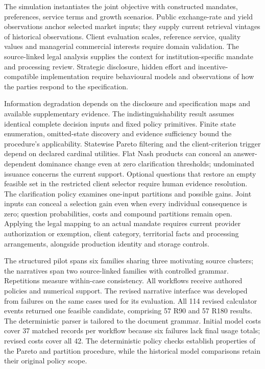 \documentclass[oneside,10pt,english]{swissi}
\begin{document}
The simulation instantiates the joint objective with constructed mandates, preferences, service terms and growth scenarios. Public exchange-rate and yield observations anchor selected market inputs; they supply current retrieval vintages of historical observations. Client evaluation scales, reference service, quality values and managerial commercial interests require domain validation. The source-linked legal analysis supplies the context for institution-specific mandate and processing review. Strategic disclosure, hidden effort and incentive-compatible implementation require behavioural models and observations of how the parties respond to the specification.

Information degradation depends on the disclosure and specification maps and available supplementary evidence. The indistinguishability result assumes identical complete decision inputs and fixed policy primitives. Finite state enumeration, omitted-state discovery and evidence sufficiency bound the procedure's applicability. Statewise Pareto filtering and the client-criterion trigger depend on declared cardinal utilities. Flat Nash products can conceal an answer-dependent dominance change even at zero clarification thresholds; undominated issuance concerns the current support. Optional questions that restore an empty feasible set in the restricted client selector require human evidence resolution. The clarification policy examines one-input partitions and possible gains. Joint inputs can conceal a selection gain even when every individual consequence is zero; question probabilities, costs and compound partitions remain open. Applying the legal mapping to an actual mandate requires current provider authorization or exemption, client category, territorial facts and processing arrangements, alongside production identity and storage controls.

The structured pilot spans six families sharing three motivating source clusters; the narratives span two source-linked families with controlled grammar. Repetitions measure within-case consistency. All workflows receive authored policies and numerical support. The revised narrative interface was developed from failures on the same cases used for its evaluation. All 114 revised calculator events returned one feasible candidate, comprising 57 R90 and 57 R180 results. The deterministic parser is tailored to the document grammar. Initial model costs cover 37 matched records per workflow because six failures lack final usage totals; revised costs cover all 42. The deterministic policy checks establish properties of the Pareto and partition procedure, while the historical model comparisons retain their original policy scope.
\end{document}
